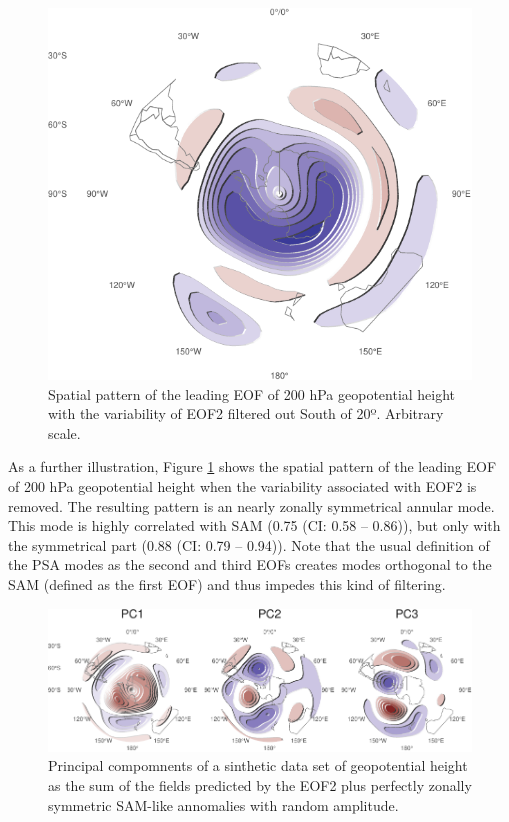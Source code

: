 \documentclass[smallextended]{svjour3}       %
\begin{document}
\begin{figure}
\centering
\includegraphics{../figures/eof-filtered-1.pdf}
\caption{\label{fig:eof-filtered}Spatial pattern of the leading EOF of 200 hPa geopotential height with the variability of EOF2 filtered out South of 20º. Arbitrary scale.}
\end{figure}

As a further illustration, Figure \ref{fig:eof-filtered} shows the spatial pattern of the leading EOF of 200 hPa geopotential height when the variability associated with EOF2 is removed. The resulting pattern is an nearly zonally symmetrical annular mode. This mode is highly correlated with SAM (0.75 (CI: 0.58 -- 0.86)), but only with the symmetrical part (0.88 (CI: 0.79 -- 0.94)). Note that the usual definition of the PSA modes as the second and third EOFs creates modes orthogonal to the SAM (defined as the first EOF) and thus impedes this kind of filtering.

\begin{figure}
\centering
\includegraphics{../figures/fake-eof-1.pdf}
\caption{\label{fig:fake-eof}Principal compomnents of a sinthetic data set of geopotential height as the sum of the fields predicted by the EOF2 plus perfectly zonally symmetric SAM-like annomalies with random amplitude.}
\end{figure}
\end{document}
